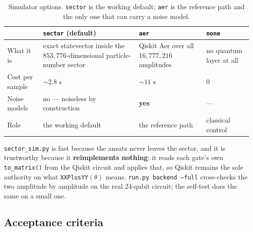 \documentclass[11pt,a4paper]{article}
\newcommand{\code}[1]{\texttt{\small #1}}
\begin{document}
\begin{table}[htbp]
\centering
\caption{Simulator options. \code{sector} is the working default; \code{aer} is
the reference path and the only one that can carry a noise model.}
\label{tab:sims}
\small
\begin{tabular}{>{\raggedright\arraybackslash}p{}>{\raggedright\arraybackslash}p{}>{\raggedright\arraybackslash}p{}>{\raggedright\arraybackslash}p{}}
\toprule
& \code{sector} (default) & \code{aer} & \code{none} \\
\midrule
What it is & exact statevector inside the $853{,}776$-dimensional
particle-number sector & Qiskit Aer over all $16{,}777{,}216$ amplitudes & no
quantum layer at all \\
\addlinespace
Cost per sample & ${\sim}2.8$ s & ${\sim}11$ s & $0$ \\
Noise models & no --- noiseless by construction & \textbf{yes} & --- \\
Role & the working default & the reference path & classical control \\
\bottomrule
\end{tabular}
\end{table}

\code{sector\_sim.py} is fast because the ansatz never leaves the sector, and it
is trustworthy because it \textbf{reimplements nothing}: it reads each gate's own
\code{to\_matrix()} from the Qiskit circuit and applies that, so Qiskit remains
the sole authority on what \code{XXPlusYY}$(\theta)$ means.
\code{run.py backend --full} cross-checks the two amplitude by amplitude on the
real 24-qubit circuit; the self-test does the same on a small one.

\subsection{Acceptance criteria}
\label{sec:criteria}
\end{document}
